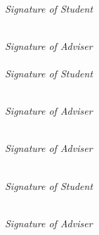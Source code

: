 \documentclass[a4paper, 12pt]{report}
\begin{document}
        	\begin{minipage}{.48\textwidth}\centering	
        	\underline{\hspace{5 cm}}\\	
        	\textit{Signature of Student}\\
        	\vspace{20 pt}
        	\end{minipage}
            \underline{\hspace{5 cm}}\\
        	\textit{Signature of Adviser}\\
         \fi
    \else
        \ifcoadvised
            \underline{\hspace{5 cm}}\\	
        	\textit{Signature of Student}\\
        	\vspace{20 pt}
            \begin{minipage}{.48\textwidth}\centering
            \underline{\hspace{5 cm}}\\
        	\textit{Signature of Adviser}\\
        	\end{minipage}%
        	\begin{minipage}{.48\textwidth}\centering	
            \underline{\hspace{5 cm}}\\
        	\textit{Signature of Adviser}\\
        	\end{minipage}
        \else	
            \begin{minipage}{.48\textwidth}\centering
        	\underline{\hspace{5 cm}}\\	
        	\textit{Signature of Student}\\
        	\vspace{20 pt}
        	\end{minipage}%
        	\begin{minipage}{.48\textwidth}\centering	
            \underline{\hspace{5 cm}}\\
        	\textit{Signature of Adviser}\\
        	\vspace{20 pt}
        	\end{minipage}
         \fi
    \fi

	
\end{document}
